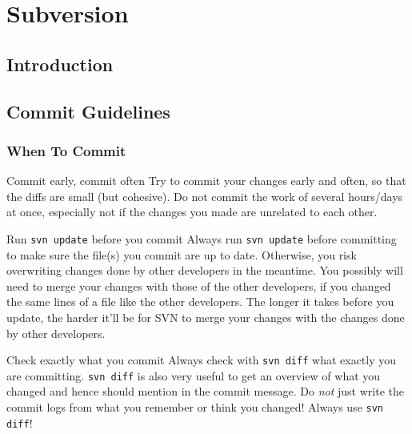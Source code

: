 %

\chapter{Subversion}
\label{cha:subversion}

\section{Introduction}
\label{sec:introduction}

\section{Commit Guidelines}
\label{sec:commit-guidelines}

\subsection{When To Commit}
\label{sec:when-to-commit}

\begin{guideline*}{Commit early, commit often}
  Try to commit your changes early and often, so that the diffs
  are small (but cohesive). Do not commit the work of several hours/days at
  once, especially not if the changes you made are unrelated to each other.
\end{guideline*}

\begin{guideline*}{Run {\tt svn update} before you commit}
  Always run {\tt svn update} before committing to make sure the file(s)
  you commit are up to date.
  Otherwise, you risk overwriting changes done by other developers in the
  meantime.
  You possibly will need to merge your changes with those of the other
  developers, if you changed the same lines of a file like the other
  developers.
  The longer it takes before you update, the harder it'll be for SVN
  to merge your changes with the changes done by other developers.
\end{guideline*}

\begin{guideline*}{Check exactly what you commit}
  Always check with {\tt svn diff} what exactly you are committing.
  {\tt svn diff} is also very useful to get an overview of what you changed
  and hence should mention in the commit message. Do \emph{not} just write
  the commit logs from what you remember or think you changed!
  Always use {\tt svn diff}!
\end{guideline*}

